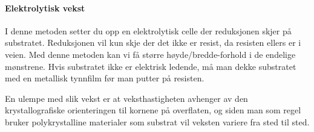 \paragraph{Elektrolytisk vekst} I denne metoden setter du opp en elektrolytisk celle der reduksjonen skjer på substratet. Reduksjonen vil kun skje der det ikke er resist, da resisten ellers er i veien. Med denne metoden kan vi få større høyde/bredde-forhold i de endelige mønstrene. Hvis substratet ikke er elektrisk ledende, må man dekke substratet med en metallisk tynnfilm før man putter på resisten.

En ulempe med slik vekst er at veksthastigheten avhenger av den krystallografiske orienteringen til kornene på overflaten, og siden man som regel bruker polykrystalline materialer som substrat vil veksten variere fra sted til sted.

